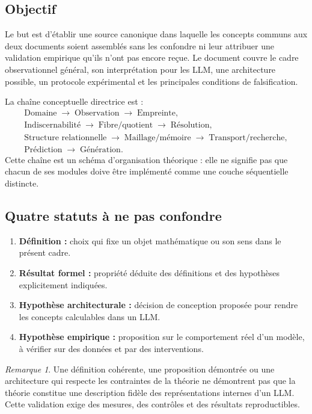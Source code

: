 \documentclass[11pt,a4paper]{article}
\theoremstyle{remark}
\newtheorem{remark}[definition]{Remarque}
\newcommand{\1}{\mathbf 1}
\begin{document}
\subsection{Objectif}
Le but est d'établir une source canonique dans laquelle les concepts communs aux deux documents soient assemblés sans les confondre ni leur attribuer une validation empirique qu'ils n'ont pas encore reçue. Le document couvre le cadre observationnel général, son interprétation pour les LLM, une architecture possible, un protocole expérimental et les principales conditions de falsification.

La chaîne conceptuelle directrice est :
\[
\boxed{\begin{gathered}
\text{Domaine}\;\longrightarrow\;\text{Observation}\;\longrightarrow\;\text{Empreinte},\\[0.3em]
\text{Indiscernabilité}\;\longrightarrow\;\text{Fibre/quotient}\;\longrightarrow\;\text{Résolution},\\[0.3em]
\text{Structure relationnelle}\;\longrightarrow\;\text{Maillage/mémoire}\;\longrightarrow\;\text{Transport/recherche},\\[0.3em]
\text{Prédiction}\;\longrightarrow\;\text{Génération}.
\end{gathered}}
\]
Cette chaîne est un schéma d'organisation théorique : elle ne signifie pas que chacun de ses modules doive être implémenté comme une couche séquentielle distincte.

\subsection{Quatre statuts à ne pas confondre}
\begin{enumerate}[label=\arabic*.]
  \item \textbf{Définition :} choix qui fixe un objet mathématique ou son sens dans le présent cadre.
  \item \textbf{Résultat formel :} propriété déduite des définitions et des hypothèses explicitement indiquées.
  \item \textbf{Hypothèse architecturale :} décision de conception proposée pour rendre les concepts calculables dans un LLM.
  \item \textbf{Hypothèse empirique :} proposition sur le comportement réel d'un modèle, à vérifier sur des données et par des interventions.
\end{enumerate}

\begin{remark}
Une définition cohérente, une proposition démontrée ou une architecture qui respecte les contraintes de la théorie ne démontrent pas que la théorie constitue une description fidèle des représentations internes d'un LLM. Cette validation exige des mesures, des contrôles et des résultats reproductibles.
\end{remark}
\end{document}
